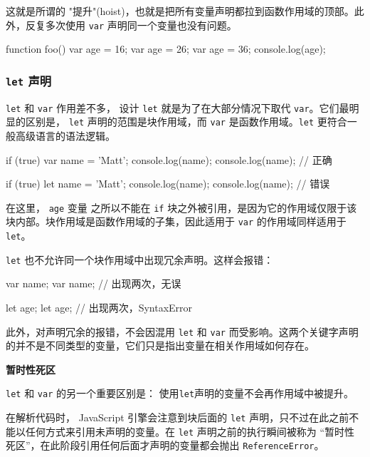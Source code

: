 这就是所谓的 "提升"(hoist)，也就是把所有变量声明都拉到函数作用域的顶部。此外，反复多次使用 \texttt{var} 声明同一个变量也没有问题。

\begin{JavaScript}
function foo() {
    var age = 16;
    var age = 26;
    var age = 36;
    console.log(age);
}
\end{JavaScript}

\subsubsection{\texttt{let} 声明}

\texttt{let} 和 \texttt{var} 作用差不多， 设计 \texttt{let} 就是为了在大部分情况下取代 \texttt{var}。它们最明显的区别是， \texttt{let} 声明的范围是块作用域，而 \texttt{var} 是函数作用域。\texttt{let} 更符合一般高级语言的语法逻辑。

\begin{JavaScript}
if (true) {
    var name = 'Matt';
    console.log(name);
}
console.log(name);  // 正确
\end{JavaScript}

\begin{JavaScript}
if (true) {
    let name = 'Matt';
    console.log(name);
}
console.log(name);  // 错误
\end{JavaScript}

在这里， \texttt{age} 变量 之所以不能在 \texttt{if} 块之外被引用，是因为它的作用域仅限于该块内部。块作用域是函数作用域的子集，因此适用于 \texttt{var} 的作用域同样适用于 \texttt{let}。

\texttt{let} 也不允许同一个块作用域中出现冗余声明。这样会报错：

\begin{JavaScript}
var name;
var name;   // 出现两次，无误

let age;
let age;    // 出现两次，SyntaxError
\end{JavaScript}

此外，对声明冗余的报错，不会因混用 \texttt{let} 和 \texttt{var} 而受影响。这两个关键字声明的并不是不同类型的变量，它们只是指出变量在相关作用域如何存在。

\noindent\textbf{暂时性死区}

\texttt{let} 和 \texttt{var} 的另一个重要区别是： 使用\texttt{let}声明的变量不会再作用域中被提升。

在解析代码时， JavaScript 引擎会注意到块后面的 \texttt{let} 声明，只不过在此之前不能以任何方式来引用未声明的变量。在 \texttt{let} 声明之前的执行瞬间被称为 ``暂时性死区''，在此阶段引用任何后面才声明的变量都会抛出 \texttt{ReferenceError}。

